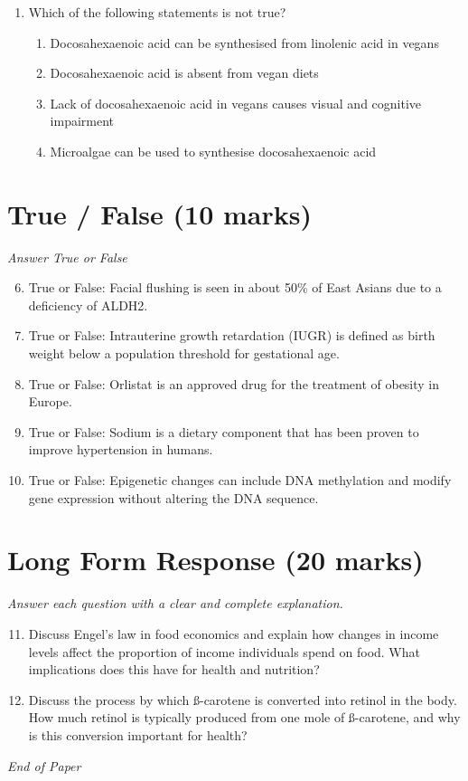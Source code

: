 \documentclass[12pt]{article}
\begin{document}
\begin{enumerate}[label=\arabic*.]
\begin{enumerate}[label=(\alph*)]
    \item Body height
    \item Body weight
\end{enumerate}
\item Which of the following statements is not true?
\begin{enumerate}[label=(\alph*)]
    \item Docosahexaenoic acid can be synthesised from linolenic acid in vegans
    \item Docosahexaenoic acid is absent from vegan diets
    \item Lack of docosahexaenoic acid in vegans causes visual and cognitive impairment
    \item Microalgae can be used to synthesise docosahexaenoic acid
\end{enumerate}
\end{enumerate}

\section*{True / False (10 marks)}
\textit{Answer True or False}
\begin{enumerate}[label=\arabic*.]
\setcounter{enumi}{5}
\item True or False: Facial flushing is seen in about 50\% of East Asians due to a deficiency of ALDH2.
\item True or False: Intrauterine growth retardation (IUGR) is defined as birth weight below a population threshold for gestational age.
\item True or False: Orlistat is an approved drug for the treatment of obesity in Europe.
\item True or False: Sodium is a dietary component that has been proven to improve hypertension in humans.
\item True or False: Epigenetic changes can include DNA methylation and modify gene expression without altering the DNA sequence.
\end{enumerate}

\section*{Long Form Response (20 marks)}
\textit{Answer each question with a clear and complete explanation.}
\begin{enumerate}[label=\arabic*.]
\setcounter{enumi}{10}
\item Discuss Engel's law in food economics and explain how changes in income levels affect the
proportion of income individuals spend on food. What implications does this have for
health and nutrition?
\item Discuss the process by which ß-carotene is converted into retinol in the body. How much
retinol is typically produced from one mole of ß-carotene, and why is this conversion
important for health?
\end{enumerate}

\vfill
\noindent\textit{End of Paper}
\end{document}
